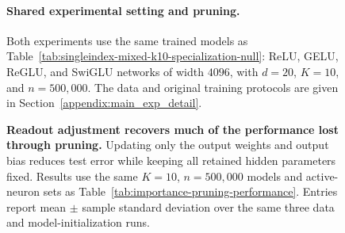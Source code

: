 \documentclass{article}
\newcounter{setting}[section]
\newcounter{model}[section]
\newcounter{initialization}[section]
\begin{document}
\begin{figure}
\begin{table}[H]
    \centering
    \small
    \renewcommand{\arraystretch}{1.15}
    \setlength{\tabcolsep}{5pt}
    \caption{\textbf{Readout adjustment recovers much of the performance lost through pruning.}
    Updating only the output weights and output bias reduces test error
    while keeping all retained hidden parameters fixed.
    Results use the same \(K=10\), \(n=500{,}000\) models and active-neuron
    sets as Table~\ref{tab:importance-pruning-performance}.
    Entries report mean \(\pm\) sample standard deviation over the same
    three data and model-initialization runs.}
    \label{tab:active-neuron-readout-only}
\end{table}

\paragraph{Shared experimental setting and pruning.}
Both experiments use the same trained models as
Table~\ref{tab:singleindex-mixed-k10-specialization-null}: ReLU, GELU,
ReGLU, and SwiGLU networks of width \(4096\), with \(d=20\), \(K=10\),
and \(n=500{,}000\). The data and original training protocols are given
in Section~\ref{appendix:main_exp_detail}.


\end{figure}
\end{document}
